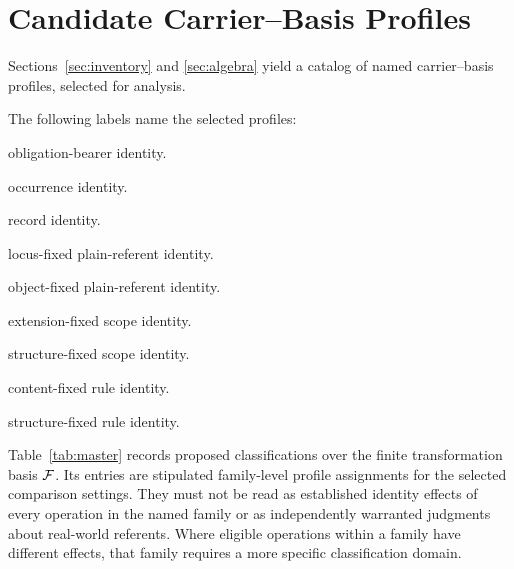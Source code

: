 
\section{Candidate Carrier--Basis Profiles}
\label{sec:profiles}

Sections~\ref{sec:inventory} and \ref{sec:algebra} yield a catalog of
named carrier--basis profiles, selected for analysis.

The following labels name the selected profiles:

\begin{description}[style=nextline,leftmargin=2.5cm]
  \item[$\OBL$] obligation-bearer identity.
  \item[$\OCC$] occurrence identity.
  \item[$\REC$] record identity.
  \item[$\LOC$] locus-fixed plain-referent identity.
  \item[$\OBJ$] object-fixed plain-referent identity.
  \item[$\SCOPEE$] extension-fixed scope identity.
  \item[$\SCOPES$] structure-fixed scope identity.
  \item[$\RULEC$] content-fixed rule identity.
  \item[$\RULES$] structure-fixed rule identity.
\end{description}

Table~\ref{tab:master} records proposed classifications over the finite
transformation basis $\mathcal{F}$.
Its entries are stipulated family-level profile assignments for the
selected comparison settings.
They must not be read as established
identity effects of every operation in the named family or as
independently warranted judgments about real-world referents.
Where eligible operations within a family have different effects,
that family requires a more specific classification domain.

